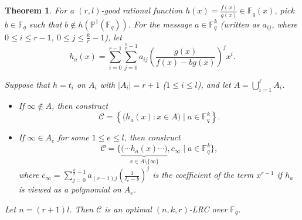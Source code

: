 \documentclass[1p,final]{elsarticle}
\newtheorem{theorem}{Theorem}[section]
\newtheorem{open problem}[theorem]{Open Problem}
\begin{document}
\begin{theorem}\label{main construction}
For a $(r,l)$-good rational function $h(x)=\displaystyle\frac{f(x)}{g(x)}\in \mathbb{F}_q(x)$, pick $b\in \mathbb{F}_{q}$ such that $b\notin h(\mathbb{P}^{1}(\mathbb{F}_{q}))$. For the message $a \in \mathbb{F}_{q}^{k}$ (written as $a_{ij}$, where $0 \le i \le r-1$, $0 \le j \le \frac{k}{r}-1$), let 
\[
h_{a}(x) = \sum_{i=0}^{r-1} \sum_{j=0}^{\frac{k}{r}-1} a_{ij} \left( \frac{g(x)}{f(x)-b g(x)} \right)^{j} x^{i}.
\]

Suppose that $h=t_{i}$ on $A_{i}$ with $|A_{i}|=r+1$ ($1\le i\le l$), and let \( A = \bigcup_{i=1}^{\ell} A_{i} \).

\begin{itemize}
	\item[(i)] If $\infty \notin A$, then construct
	\[
	\mathcal{C} = \left\{ \big( h_{a}(x) : x \in A \big) \mid a \in \mathbb{F}_{q}^{k} \right\}.
	\]
	
	\item[(ii)] If $\infty \in A_{e}$ for some $1\le e\le l$, then construct
	\[
	\mathcal{C} = \Bigg\{ \underbrace{\Big( \cdots h_{a}(x) \cdots \Big)}_{x \in A\setminus\{\infty\}}, c_{\infty} \mid a \in \mathbb{F}_{q}^{k} \Bigg\},
	\]
	where $c_{\infty} = \displaystyle\sum_{j=0}^{\frac{k}{r}-1} a_{(r-1)j} \left( \frac{1}{t_{e}-b} \right)^{j}$ is the coefficient of the term $x^{r-1}$ if $h_{a}$ is viewed as a polynomial on $A_{e}$.
\end{itemize}

Let $n=(r+1)l$. Then \( \mathcal{C} \) is an optimal \( (n, k, r) \)-LRC over \( \mathbb{F}_{q} \).
\end{theorem}
\end{document}
